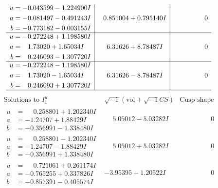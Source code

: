 \documentclass[1p]{elsarticle_modified}
\theoremstyle{definition}
\newcommand{\I}{\sqrt{-1}}
\begin{document}
$$\begin{array}{c|c|c}
\begin{aligned}
u &= -0.043599 - 1.224900 I \\
a &= -0.081497 - 0.491243 I \\
b &= -0.773182 - 0.003155 I\end{aligned}
 & \phantom{-}0.851004 + 0.795140 I & \phantom{-0.000000 } 0 \\ \hline\begin{aligned}
u &= -0.272248 + 1.198580 I \\
a &= \phantom{-}1.73020 + 1.65034 I \\
b &= \phantom{-}0.246093 - 1.307720 I\end{aligned}
 & \phantom{-}6.31626 + 8.78487 I & \phantom{-0.000000 } 0 \\ \hline\begin{aligned}
u &= -0.272248 - 1.198580 I \\
a &= \phantom{-}1.73020 - 1.65034 I \\
b &= \phantom{-}0.246093 + 1.307720 I\end{aligned}
 & \phantom{-}6.31626 - 8.78487 I & \phantom{-0.000000 } 0\\
 \hline 
 \end{array}$$\newpage$$\begin{array}{c|c|c}  
\text{Solutions to }I^u_{1}& \I (\text{vol} + \sqrt{-1}CS) & \text{Cusp shape}\\
 \hline 
\begin{aligned}
u &= \phantom{-}0.258801 + 1.202340 I \\
a &= -1.24707 + 1.88429 I \\
b &= -0.356991 - 1.338480 I\end{aligned}
 & \phantom{-}5.05012 - 5.03282 I & \phantom{-0.000000 } 0 \\ \hline\begin{aligned}
u &= \phantom{-}0.258801 - 1.202340 I \\
a &= -1.24707 - 1.88429 I \\
b &= -0.356991 + 1.338480 I\end{aligned}
 & \phantom{-}5.05012 + 5.03282 I & \phantom{-0.000000 } 0 \\ \hline\begin{aligned}
u &= \phantom{-}0.721061 + 0.261174 I \\
a &= -0.765255 + 0.337826 I \\
b &= -0.857391 - 0.405574 I\end{aligned}
 & -3.95395 + 1.20522 I & \phantom{-0.000000 } 0 \\ \hline\begin{aligned}

\end{aligned}
\end{array}$$
\end{document}
